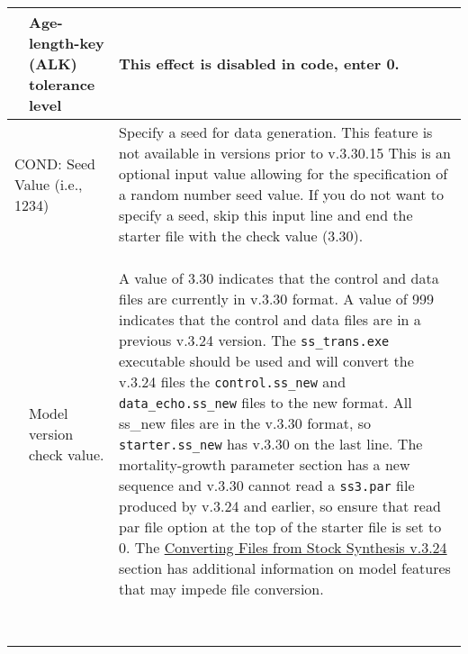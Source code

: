 {\begin{landscape}
\begin{longtable}{p{1.5cm} p{7.2cm} p{12.3cm}}
  \hline
  \raisebox{0.1\ht\strutbox}{\hypertarget{ALK}{0}} & Age-length-key (ALK) tolerance level & This effect is disabled in code, enter 0. \Tstrut\Bstrut\\

  \hline  
  \multicolumn{2}{l}{COND: Seed Value (i.e., 1234)}& \multirow{1}{1cm}[-0.25cm]{\parbox{12.5cm}{Specify a seed for data generation. This feature is not available in versions prior to v.3.30.15 This is an optional input value allowing for the specification of a random number seed value. If you do not want to specify a seed, skip this input line and end the starter file with the check value (3.30).}} \Tstrut\Bstrut\\
  & & \\ 
  & & \Bstrut\\
  & & \\
  
 \pagebreak
 \raisebox{0.1\ht\strutbox}{\hypertarget{Convert}{3.30}} & Model version check value. & \multirow{1}{1cm}[-0.25cm]{\parbox{12.5cm}{A value of 3.30 indicates that the control and data files are currently in v.3.30 format. A value of 999 indicates that the control and data files are in a previous v.3.24 version. The \texttt{ss\_trans.exe} executable should be used and will convert the v.3.24 files the \texttt{control.ss\_new} and \texttt{data\_echo.ss\_new} files to the new format. All ss\_new files are in the v.3.30 format, so \texttt{starter.ss\_new} has v.3.30 on the last line. The mortality-growth parameter section has a new sequence and v.3.30 cannot read a \texttt{ss3.par} file produced by v.3.24 and earlier, so ensure that read par file option at the top of the starter file is set to 0. The \hyperlink{ConvIssues}{Converting Files from Stock Synthesis v.3.24} section has additional information on model features that may impede file conversion.}} \Tstrut\Bstrut\\
     & & \\  
     & & \\  
	   & & \\
     & & \\
   	 & & \\
     & & \\  
     & & \\  
     & & \\

\end{longtable}
\end{landscape}
}
\restoregeometry





\pagebreak
